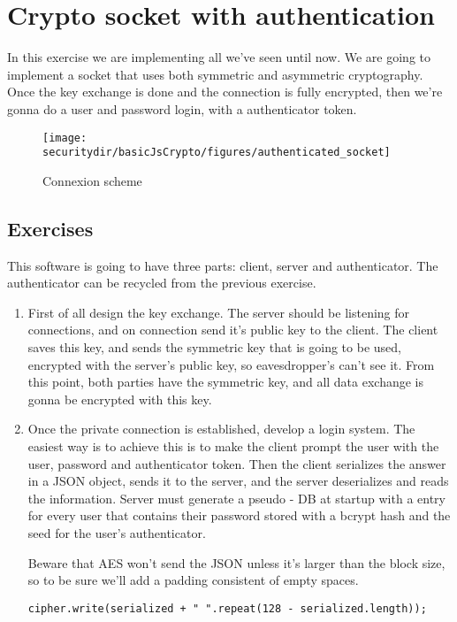\section{Crypto socket with authentication}

In this exercise we are implementing all we've seen until now. We are going to implement a socket that uses both symmetric and asymmetric cryptography. Once the key exchange is done and the connection is fully encrypted, then we're gonna do a user and password login, with a authenticator token.

\begin{figure}[htb]
	\begin{centering}
		\texttt{[image: \\securitydir/basicJsCrypto/figures/authenticated\_socket]}
		\par\end{centering}
	\caption{\label{fig:authenticated_socket} Connexion scheme}
\end{figure}


\subsection{Exercises}
This software is going to have three parts: client, server and authenticator. The authenticator can be recycled from the previous exercise. 
\begin{enumerate}
	\item First of all design the key exchange. The server should be listening for connections, and on connection send it's public key to the client. The client saves this key, and sends the symmetric key that is going to be used, encrypted with the server's public key, so eavesdropper's can't see it. From this point, both parties have the symmetric key, and all data exchange is gonna be encrypted with this key.
	
	\item Once the private connection is established, develop a login system. The easiest way is to achieve this is to make the client prompt the user with the user, password and authenticator token. Then the client serializes the answer in a JSON object, sends it to the server, and the server deserializes and reads the information. Server must generate a pseudo - DB at startup with a entry for every user that contains their password stored with a bcrypt hash and the seed for the user's authenticator.
	
	Beware that AES won't send the JSON unless it's larger than the block size, so to be sure we'll add a padding consistent of empty spaces.
	
	\begin{lstlisting}[style=JavaScript]
	cipher.write(serialized + " ".repeat(128 - serialized.length));
	\end{lstlisting}
\end{enumerate}

